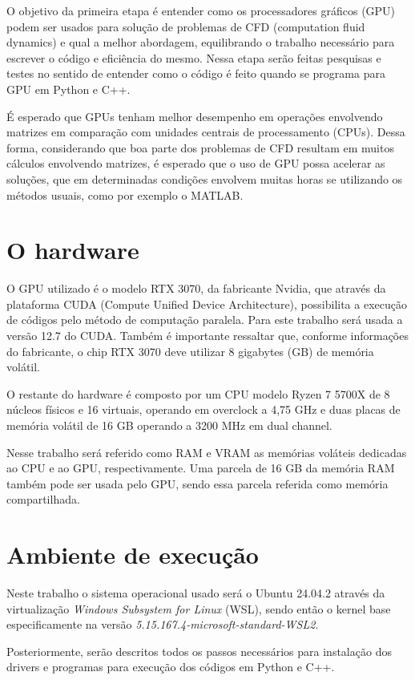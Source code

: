 \documentclass[
    12pt,
    openright,
    oneside,
    a4paper,
    english,
    brazil,
]{abntex2}
\begin{document}
O objetivo da primeira etapa é entender como os processadores gráficos (GPU) podem ser usados para solução de problemas de CFD (computation fluid dynamics) e qual a melhor abordagem, equilibrando o trabalho necessário para escrever o código e eficiência do mesmo. Nessa etapa serão feitas pesquisas e testes no sentido de entender como o código é feito quando se programa para GPU em Python e C++.

É esperado que GPUs tenham melhor desempenho em operações envolvendo matrizes em comparação com unidades centrais de processamento (CPUs). Dessa forma, considerando que boa parte dos problemas de CFD resultam em muitos cálculos envolvendo matrizes, é esperado que o uso de GPU possa acelerar as soluções, que em determinadas condições envolvem muitas horas se utilizando os métodos usuais, como por exemplo o MATLAB.

\section{O hardware}

O GPU utilizado é o modelo RTX 3070, da fabricante Nvidia, que através da plataforma CUDA (Compute Unified Device Architecture), possibilita a execução de códigos pelo método de computação paralela. Para este trabalho será usada a versão 12.7 do CUDA. Também é importante ressaltar que, conforme informações do fabricante, o chip RTX 3070 deve utilizar 8 gigabytes (GB) de memória volátil.

O restante do hardware é composto por um CPU modelo Ryzen 7 5700X de 8 núcleos físicos e 16 virtuais, operando em overclock a 4,75 GHz e duas placas de memória volátil de 16 GB operando a 3200 MHz em dual channel.

Nesse trabalho será referido como RAM e VRAM as memórias voláteis dedicadas ao CPU e ao GPU, respectivamente. Uma parcela de 16 GB da memória RAM também pode ser usada pelo GPU, sendo essa parcela referida como memória compartilhada.

\section{Ambiente de execução}

Neste trabalho o sistema operacional usado será o Ubuntu 24.04.2 através da virtualização \emph{Windows Subsystem for Linux} (WSL), sendo então o kernel base especificamente na versão \emph{5.15.167.4-microsoft-standard-WSL2}.

Posteriormente, serão descritos todos os passos necessários para instalação dos drivers e programas para execução dos códigos em Python e C++.
\end{document}
